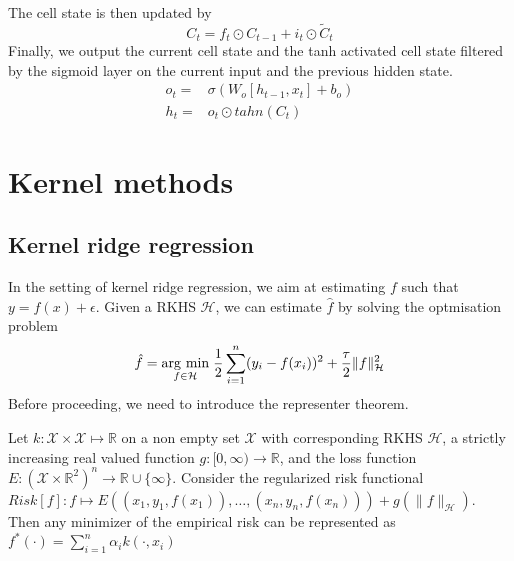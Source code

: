 The cell state is then updated by
\begin{equation}
    C_t=f_t\odot C_{t-1}+i_t\odot \tilde{C}_t
\end{equation}
Finally, we output the current cell state and the tanh activated cell state filtered by the sigmoid layer on the current input and the previous hidden state.
\begin{equation}
    \begin{aligned}
    o_t=& \sigma(W_o[h_{t-1},x_t]+b_o)
    \\
    h_t=& o_t \odot tahn(C_t)
\end{aligned}
\end{equation}


\section{Kernel methods}
\subsection{Kernel ridge regression}
In the setting of kernel ridge regression, we aim at estimating $f$ such that $y=f(x)+\epsilon$. Given a RKHS $\mathcal{H}$, we can estimate $\hat{f}$ by solving the optmisation problem
\begin{equation}\label{eq:kernel ridge}
    \hat{f}=\underset{f\in \mathcal{H}}{\operatorname{arg}\,\operatorname{min}}\;\frac{1}{2}\sum\limits_{i=1}^n(y_i-f(x_i))^2+\frac{\tau}{2}\|f\|_{\mathcal{H}}^2
\end{equation}
Before proceeding, we need to introduce the representer theorem.
\begin{theorem}
    Let $k:\mathcal{X} \times \mathcal{X} \mapsto \mathbb{R}$ on a non empty set $\mathcal{X}$ with corresponding RKHS $\mathcal{H}$,
    a strictly increasing real valued function $g:[0,\infty) \to \mathbb{R}$, and the loss function $E:(\mathcal{X}\times \mathbb{R}^2)^n \to \mathbb{R} \cup \{\infty\}$.
    Consider the regularized risk functional $Risk[f]:f \mapsto  E\left((x_{1},y_{1},f(x_{1})),\ldots, (x_{n},y_{n},f(x_{n}))\right)+g\left(\| f\|_{\mathcal{H}} \right)$. Then any minimizer of the empirical risk can be represented as $ f^{*}(\cdot )=\sum\limits_{i=1}^{n}\alpha _{i}k(\cdot ,x_{i})$
\end{theorem}

